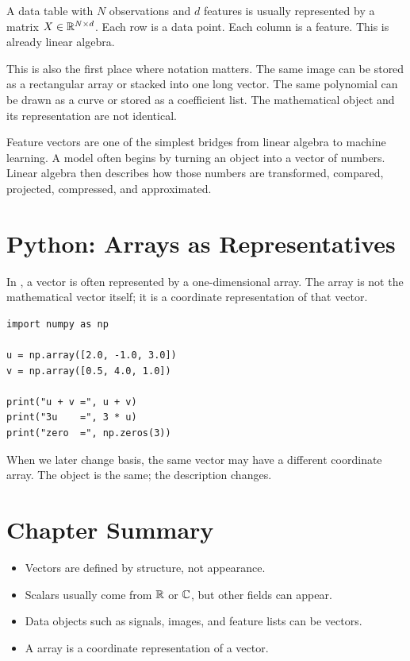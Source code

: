 A data table with $N$ observations and $d$ features is usually represented by
a matrix $X\in \mathbb{R}^{N\times d}$. Each row is a data point. Each column is a
feature. This is already linear algebra.

This is also the first place where notation matters. The same image can be
stored as a rectangular array or stacked into one long vector. The same
polynomial can be drawn as a curve or stored as a coefficient list. The
mathematical object and its representation are not identical.

\begin{aimlbox}
Feature vectors are one of the simplest bridges from linear algebra to machine
learning. A model often begins by turning an object into a vector of numbers.
Linear algebra then describes how those numbers are transformed, compared,
projected, compressed, and approximated.
\end{aimlbox}

\section{Python: Arrays as Representatives}

In \Python, a vector is often represented by a one-dimensional \NumPy array.
The array is not the mathematical vector itself; it is a coordinate
representation of that vector.

\begin{lstlisting}
import numpy as np

u = np.array([2.0, -1.0, 3.0])
v = np.array([0.5, 4.0, 1.0])

print("u + v =", u + v)
print("3u    =", 3 * u)
print("zero  =", np.zeros(3))
\end{lstlisting}

When we later change basis, the same vector may have a different coordinate
array. The object is the same; the description changes.

\section*{Chapter Summary}

\begin{itemize}
  \item Vectors are defined by structure, not appearance.
  \item Scalars usually come from $\mathbb{R}$ or $\mathbb{C}$, but other fields can appear.
  \item Data objects such as signals, images, and feature lists can be vectors.
  \item A \NumPy array is a coordinate representation of a vector.
\end{itemize}

